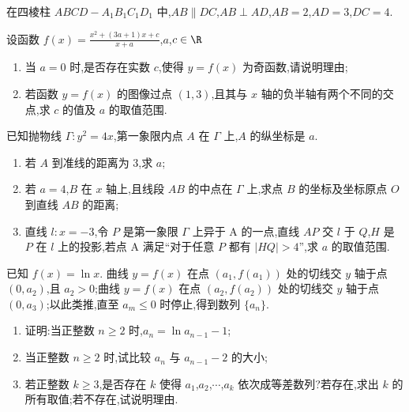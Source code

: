 \begin{problem}
在四棱柱 \(ABCD-A_1B_1C_1D_1\) 中,\(AB\parallel DC\),\(AB\perp AD\),\(AB=2\),\(AD=3\),\(DC=4\).

\end{problem}

\begin{problem}
设函数 \(f(x)=\frac{x^2+(3a+1)x+c}{x+a}\),\(a\),\(c\in\R\)
\begin{enumerate}
\item 当 \(a=0\) 时,是否存在实数 \(c\),使得 \(y=f(x)\) 为奇函数,请说明理由;
\item 若函数 \(y=f(x)\) 的图像过点 \((1,3)\),且其与 \(x\) 轴的负半轴有两个不同的交点,求 \(c\) 的值及 \(a\) 的取值范围.
\end{enumerate}
\end{problem}

\begin{problem}
已知抛物线 \(\Gamma:y^2=4x\),第一象限内点 \(A\) 在 \(\Gamma\) 上,\(A\) 的纵坐标是 \(a\).
\begin{enumerate}
\item 若 \(A\) 到准线的距离为 \(3\),求 \(a\);
\item 若 \(a=4\),\(B\) 在 \(x\) 轴上,且线段 \(AB\) 的中点在 \(\Gamma\) 上,求点 \(B\) 的坐标及坐标原点 \(O\) 到直线 \(AB\) 的距离;
\item 直线 \(l:x=-3\),令 \(P\) 是第一象限 \(\Gamma\) 上异于 A 的一点,直线 \(AP\) 交 \(l\) 于 \(Q\),\(H\) 是 \(P\) 在 \(l\) 上的投影,若点 A 满足``对于任意 \(P\) 都有 \(\left|HQ\right|>4\)'',求 \(a\) 的取值范围.
\end{enumerate}
\end{problem}

\begin{problem}
已知 \(f(x)=\ln x\). 曲线 \(y=f(x)\) 在点 \(\left(a_1,f(a_1)\right)\) 处的切线交 \(y\) 轴于点 \((0,a_2)\),且 \(a_2>0\);曲线 \(y=f(x)\) 在点 \(\left(a_2,f(a_2)\right)\) 处的切线交 \(y\) 轴于点 \((0,a_3)\);以此类推,直至 \(a_m\le 0\) 时停止,得到数列 \(\{a_n\}\).
\begin{enumerate}
\item 证明:当正整数 \(n\ge 2\) 时,\(a_n=\ln a_{n-1}-1\);
\item 当正整数 \(n\ge 2\) 时,试比较 \(a_n\) 与 \(a_{n-1}-2\) 的大小;
\item 若正整数 \(k\ge 3\),是否存在 \(k\) 使得 \(a_1\),\(a_2\),\(\cdots\),\(a_k\) 依次成等差数列?若存在,求出 \(k\) 的所有取值;若不存在,试说明理由.
\end{enumerate}
\end{problem}

